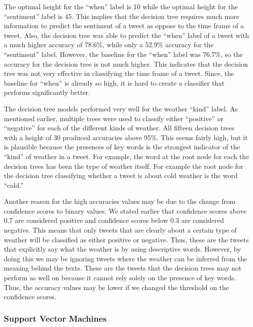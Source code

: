 	The optimal height for the ``when'' label is 10 while the optimal height for the ``sentiment'' label is 45. This implies that the decision tree requires much more information to predict the sentiment of a tweet as oppose to the time frame of a tweet. Also, the decision tree was able to predict the ``when'' label of a tweet with a much higher accuracy of 78.6\%, while only a 52.9\% accuracy for the ``sentiment'' label. However, the baseline for the ``when'' label was 76.7\%, so the accuracy for the decision tree is not much higher. This indicates that the decision tree was not very effective in classifying the time frame of a tweet. Since, the baseline for ``when'' is already so high, it is hard to create a classifier that performs significantly better.   

            The decision tree models performed very well for the weather ``kind'' label. As mentioned earlier, multiple trees were used to classify either ``positive'' or ``negative'' for each of the different kinds of weather. All fifteen decision trees with a height of 30 produced accuracies above 95\%. This seems fairly high, but it is plausible because the presences of key words is the strongest indicator of the ``kind'' of weather in a tweet. For example, the word at the root node for each the decision trees has been the type of weather itself. For example the root node for the decision tree classifying whether a tweet is about cold weather is the word ``cold.'' 

	Another reason for the high accuracies values may be due to the change from confidence scores to binary values. We stated earlier that confidence scores above 0.7 are considered positive and confidence scores below 0.3 are considered negative. This means that only tweets that are clearly about a certain type of weather will be classified as either positive or negative. Thus, these are the tweets that explicitly say what the weather is by using descriptive words. However, by doing this we may be ignoring tweets where the weather can be inferred from the meaning behind the texts. These are the tweets that the decision trees may not perform as well on because it cannot rely solely on the presence of key words. Thus, the accuracy values may be lower if we changed the threshold on the confidence scores. 

\subsubsection{Support Vector Machines}

